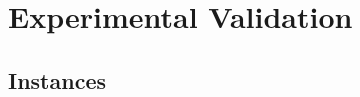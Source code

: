 \documentclass[10pt,conference,compsocconf]{IEEEtran}
\begin{document}
%
%
%
%
%
%





\section{Experimental Validation}
\label{sec:expe}

\subsection{Instances}
\end{document}
